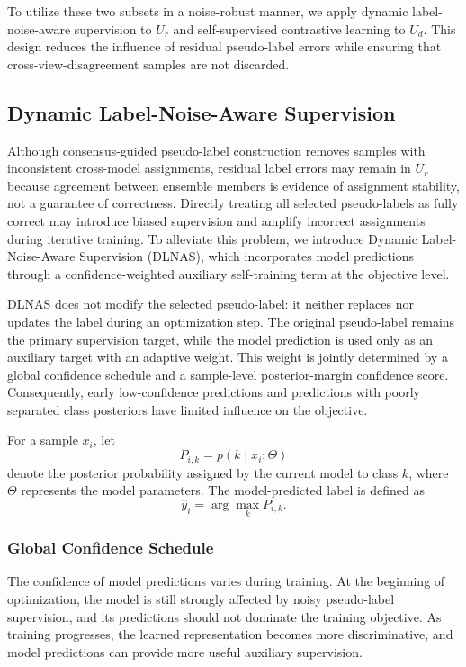 \documentclass[journal]{IEEEtran}
\begin{document}
To utilize these two subsets in a noise-robust manner, we apply dynamic label-noise-aware supervision to $U_r$ and self-supervised contrastive learning to $U_d$.
This design reduces the influence of residual pseudo-label errors while ensuring that cross-view-disagreement samples are not discarded.

\subsection{Dynamic Label-Noise-Aware Supervision}

Although consensus-guided pseudo-label construction removes samples with inconsistent cross-model assignments, residual label errors may remain in $U_r$ because agreement between ensemble members is evidence of assignment stability, not a guarantee of correctness.
Directly treating all selected pseudo-labels as fully correct may introduce biased supervision and amplify incorrect assignments during iterative training.
To alleviate this problem, we introduce Dynamic Label-Noise-Aware Supervision (DLNAS), which incorporates model predictions through a confidence-weighted auxiliary self-training term at the objective level.

DLNAS does not modify the selected pseudo-label: it neither replaces nor updates the label during an optimization step. The original pseudo-label remains the primary supervision target, while the model prediction is used only as an auxiliary target with an adaptive weight. This weight is jointly determined by a global confidence schedule and a sample-level posterior-margin confidence score. Consequently, early low-confidence predictions and predictions with poorly separated class posteriors have limited influence on the objective.

For a sample $x_i$, let
\begin{equation}
P_{i,k}=p(k\mid x_i;\Theta)
\end{equation}
denote the posterior probability assigned by the current model to class $k$, where $\Theta$ represents the model parameters.
The model-predicted label is defined as
\begin{equation}
\hat{y}_i=\arg\max_k P_{i,k}.
\end{equation}

\subsubsection{Global Confidence Schedule}

The confidence of model predictions varies during training.
At the beginning of optimization, the model is still strongly affected by noisy pseudo-label supervision, and its predictions should not dominate the training objective.
As training progresses, the learned representation becomes more discriminative, and model predictions can provide more useful auxiliary supervision.
\end{document}
